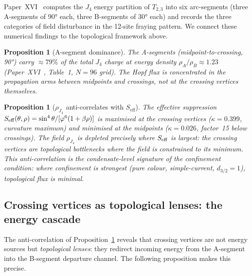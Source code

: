 \documentclass[11pt,a4paper]{article}
\newtheorem{proposition}[theorem]{Proposition}
\theoremstyle{definition}\newtheorem{definition}[theorem]{Definition}
\theoremstyle{remark}
\newcommand{\vp}{\varphi}
\newcommand{\dimq}[1]{d_{#1}}
\begin{document}
Paper~XVI~\cite{Paper16} computes the $J_4$ energy partition of
$T_{2,3}$ into six arc-segments (three A-segments of 90° each,
three B-segments of 30° each) and records the three categories
of field disturbance in the 12-site fraying pattern.  We connect
these numerical findings to the topological framework above.

\begin{proposition}[A-segment dominance]
\label{P18:prop:arcseg_dominance}
The A-segments (midpoint-to-crossing, 90°) carry $\approx79\%$
of the total $J_4$ charge at energy density $\rho_A/\rho_B\approx1.23$
(Paper~XVI~\cite{Paper16}, Table~1, $N=96$ grid).
The Hopf flux is concentrated in the propagation arms between midpoints
and crossings, not at the crossing vertices themselves.
\end{proposition}

\begin{proposition}[$\rho_{J_4}$ anti-correlates with $S_{\mathrm{eff}}$]
\label{P18:prop:anticorrelation}
The effective suppression $S_{\rm eff}(\theta,\rho)=
\sin^4\theta/[\vp^6(1+\beta\rho)]$ is maximised at the crossing
vertices ($\kappa=0.399$, curvature maximum) and minimised at the
midpoints ($\kappa=0.026$, factor~15 below crossings).
The field $\rho_{J_4}$ is depleted precisely where $S_{\rm eff}$
is largest: the crossing vertices are topological bottlenecks
where the field is constrained to its minimum.
This anti-correlation is the condensate-level signature of the
confinement condition: where confinement is strongest
(pure colour, simple-current, $\dimq{3/2}=1$), topological flux
is minimal.
\end{proposition}

\subsection{Crossing vertices as topological lenses: the energy cascade}
\label{P18:sec:cascade}

The anti-correlation of Proposition~\ref{P18:prop:anticorrelation}
reveals that crossing vertices are not energy sources but
\emph{topological lenses}: they redirect incoming energy
from the A-segment into the B-segment departure channel.
The following proposition makes this precise.
\end{document}
